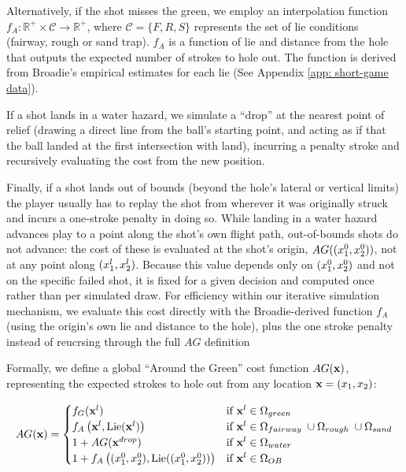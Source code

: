 \documentclass[11pt, letterpaper]{article}
\begin{document}
Alternatively, if the shot misses the green, we employ an interpolation function $f_A: \mathbb{R}^+ \times \mathcal{C} \to \mathbb{R}^+$, where $\mathcal{C} = \{F, R, S\}$ represents the set of lie conditions (fairway, rough or sand trap). $f_A$ is a function of lie and distance from the hole that outputs the expected number of strokes to hole out. The function is derived from Broadie's empirical estimates for each lie (See Appendix \ref{app: short-game data}).

If a shot lands in a water hazard, we simulate a ``drop'' at the nearest point of relief (drawing a direct line from the ball's starting point, and acting as if that the ball landed at the first intersection with land), incurring a penalty stroke and recursively evaluating the cost from the new position.

Finally, if a shot lands out of bounds (beyond the hole's lateral or vertical limits) the player usually has to replay the shot from wherever it was originally struck and incurs a one-stroke penalty in doing so. While landing in a water hazard advances play to a point along the shot's own flight path, out-of-bounds shots do not advance: the cost of these is evaluated at the shot's origin, $AG((x_1^0,x_2^0))$, not at any point along $(x_1^l,x_2^l)$. Because this value depends only on $(x_1^0,x_2^0)$ and not on the specific failed shot, it is fixed for a given decision and computed once rather than per simulated draw. For efficiency within our iterative simulation mechanism, we evaluate this cost directly with the Broadie-derived function $f_A$ (using the origin's own lie and distance to the hole), plus the one stroke penalty instead of reucrsing through the full $AG$ definition

Formally, we define a global ``Around the Green'' cost function $AG(\mathbf{x})$, representing the expected strokes to hole out from any location $\mathbf{x} = (x_1, x_2)$:

\begin{equation}
\label{eq: AG}
    AG(\mathbf{x}) = \begin{cases}
    f_G(\mathbf{x}^l)& \text{if } \mathbf{x}^l \in \Omega_{green} \\
    f_A\left(\mathbf{x}^l, \text{Lie}(\mathbf{x}^l)\right) & \text{if } \mathbf{x}^l \in \Omega_{fairway}\; \cup \Omega_{rough} \; \cup \Omega_{sand}  \\
    1 + AG(\mathbf{x}^{drop}) & \text{if } \mathbf{x}^l \in \Omega_{water} \\
    1 + f_A\left((x_1^0,x_2^0), \text{Lie}((x_1^0,x_2^0))\right) & \text{if } \mathbf{x}^l \in \Omega_{OB}
\end{cases}
\end{equation}
\end{document}
